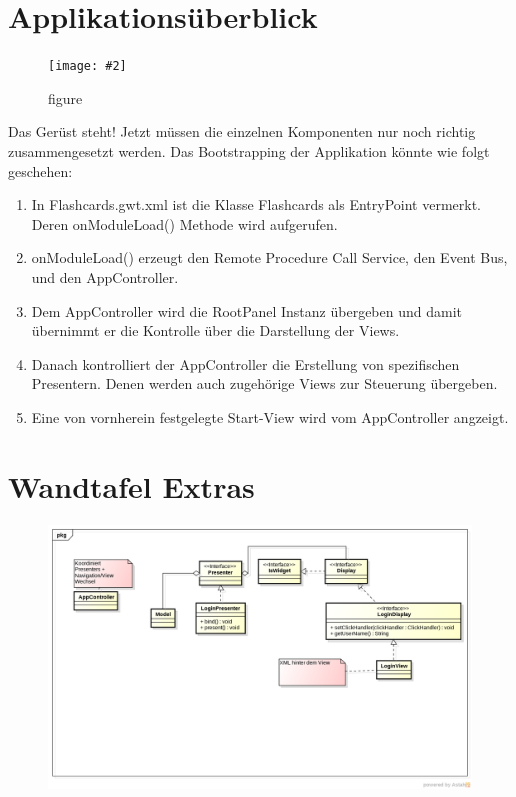 \documentclass[a4paper,10pt]{scrreprt}
\newcommand{\pic}[2][figure]{\begin{figure}[h]
 \centering
 \texttt{[image: \#2]}
 \caption{#1}
\end{figure}
}
\begin{document}
\section{Applikationsüberblick}
\pic{apu.png}

Das Gerüst steht! Jetzt müssen die einzelnen Komponenten nur noch richtig zusammengesetzt
werden. Das Bootstrapping der Applikation könnte wie folgt geschehen:
\begin{enumerate}
\item In Flashcards.gwt.xml ist die Klasse Flashcards als EntryPoint vermerkt. Deren
onModuleLoad() Methode wird aufgerufen.
\item onModuleLoad() erzeugt den Remote Procedure Call Service, den Event Bus, und den
AppController.
\item Dem AppController wird die RootPanel Instanz übergeben und damit übernimmt er die
Kontrolle über die Darstellung der Views.
\item Danach kontrolliert der AppController die Erstellung von spezifischen Presentern. Denen
werden auch zugehörige Views zur Steuerung übergeben.
\item Eine von vornherein festgelegte Start-View wird vom AppController angzeigt.
\end{enumerate}

\section{Wandtafel Extras}
\begin{figure}[h]
 \centering
 \includegraphics[scale=0.6,angle=90]{./wtextra.png}
\end{figure}
\end{document}
